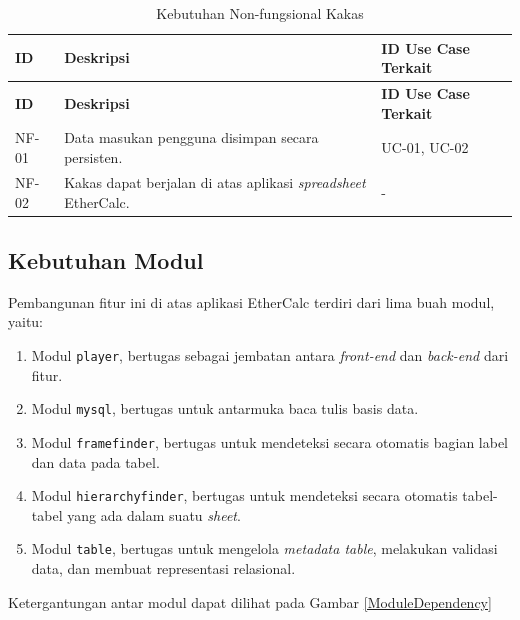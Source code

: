 \begin{small}
	\begin{longtable}{ | p{2cm} | p{6cm} | p{4cm} | }
		\caption{Kebutuhan Non-fungsional Kakas}
		\label{KebutuhanNonfungsional}                                                                                                                                    \\ \hline
		\centering\bfseries{ID} & \centering\bfseries{Deskripsi}                                        & \centering\bfseries{ID Use Case Terkait} \tabularnewline \hline
		\endfirsthead
		\hline
		\centering\bfseries{ID} & \centering\bfseries{Deskripsi}                                        & \centering\bfseries{ID Use Case Terkait} \tabularnewline \hline
		\endhead
		NF-01                   & Data masukan pengguna disimpan secara persisten.                      & UC-01, UC-02                                                    \\ \hline
		NF-02                   & Kakas dapat berjalan di atas aplikasi \textit{spreadsheet} EtherCalc. & -                                                               \\ \hline
	\end{longtable}
\end{small}

\subsection{Kebutuhan Modul} \label{KebutuhanModul}
Pembangunan fitur ini di atas aplikasi EtherCalc terdiri dari lima buah modul, yaitu:
\begin{enumerate}
	\item Modul \texttt{player}, bertugas sebagai jembatan antara \textit{front-end} dan \textit{back-end} dari fitur.
	\item Modul \texttt{mysql}, bertugas untuk antarmuka baca tulis basis data.
	\item Modul \texttt{framefinder}, bertugas untuk mendeteksi secara otomatis bagian label dan data pada tabel.
	\item Modul \texttt{hierarchyfinder}, bertugas untuk mendeteksi secara otomatis tabel-tabel yang ada dalam suatu \textit{sheet}.
	\item Modul \texttt{table}, bertugas untuk mengelola \textit{metadata table}, melakukan validasi data, dan membuat representasi relasional.
\end{enumerate}

Ketergantungan antar modul dapat dilihat pada Gambar \ref{ModuleDependency}

